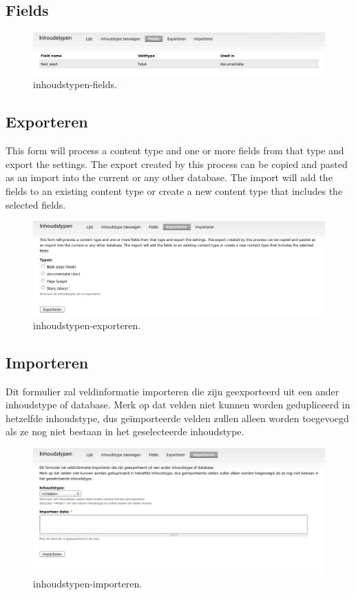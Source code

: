 \subsection{Fields}
\begin{figure}[!h]
    \centering
   \includegraphics[scale=0.3,angle=0]{inhoudstypen-fields}
   \caption{inhoudstypen-fields.\label{white}}
 \end{figure}

\subsection{Exporteren} 
This form will process a content type and one or more fields from that type and
export the settings. The export created by this process can be copied and pasted as
an import into the current or any other database. The import will add the fields to
an existing content type or create a new content type that includes the selected fields.
\begin{figure}[!h]
    \centering
   \includegraphics[scale=0.3,angle=0]{inhoudstypen-exporteren}
   \caption{inhoudstypen-exporteren.\label{white}}
 \end{figure}

\subsection{Importeren} 
Dit formulier zal veldinformatie importeren die zijn geexporteerd uit een ander inhoudstype of database.
Merk op dat velden niet kunnen worden gedupliceerd in hetzelfde inhoudstype, dus
ge\"importeerde velden zullen alleen worden toegevoegd als ze nog niet bestaan
in het geselecteerde inhoudstype. \begin{figure}[!h]
    \centering
   \includegraphics[scale=0.3,angle=0]{inhoudstypen-importeren}
   \caption{inhoudstypen-importeren.\label{white}}
 \end{figure}

